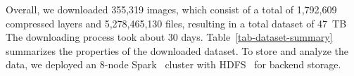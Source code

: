 Overall, we downloaded 355,319 images, which consist of a total of 1,792,609
compressed layers and 5,278,465,130 files, resulting in a total dataset
of 47~TB
The downloading process took about 30 days.
%
%
Table~\ref{tab-dataset-summary} summarizes the properties of the downloaded
dataset.
%
%
%
%
%
To store and analyze the data, we deployed an 8-node Spark~
cluster with HDFS~ for backend storage.
%

